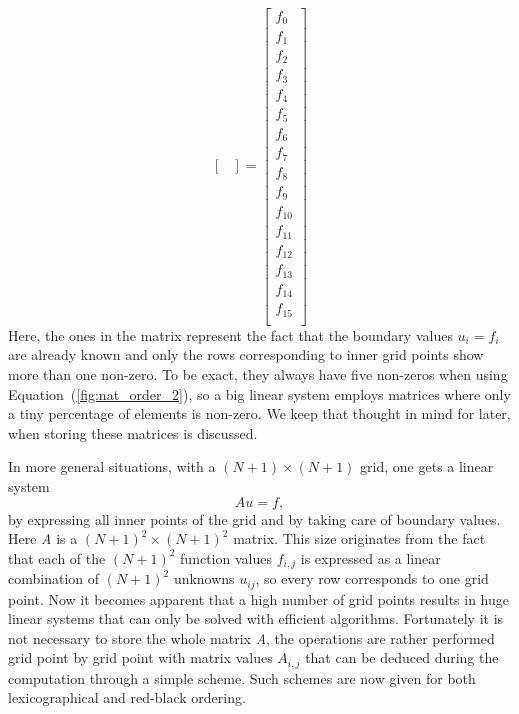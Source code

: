 \begin{equation}
\begin{bmatrix}
 \end{bmatrix} =
 \begin{bmatrix}
  f_{0}   \\
  f_{1}   \\
  f_{2}   \\
  f_{3}   \\
  f_{4}   \\
  f_{5}   \\
  f_{6}   \\
  f_{7}   \\
  f_{8}   \\
  f_{9}   \\
  f_{10}   \\
  f_{11}   \\
  f_{12}   \\
  f_{13}   \\
  f_{14}   \\
  f_{15}   \\
 \end{bmatrix}
 \label{equ:hugeA}
\end{equation}
Here, the ones in the matrix represent the fact that the boundary values $u_i = f_i$ are already known and only the rows corresponding to inner grid points show more than one non-zero. To be exact, they always have five non-zeros when using Equation~(\ref{fig:nat_order_2}), so a big linear system employs matrices where only a tiny percentage of elements is non-zero. We keep that thought in mind for later, when storing these matrices is discussed.


In more general situations, with a $(N+1) \times (N+1)$ grid, one gets a linear system
\begin{equation}
Au = f,
\end{equation}
by expressing all inner points of the grid and by taking care of boundary values. Here \textit{A} is a $(N+1) ^2 \times (N+1)^2$ matrix. This size originates from the fact that each of the $(N+1)^2$ function values $f_{i,j}$ is expressed as a linear combination of $(N+1)^2$ unknowns $u_{ij}$, so every row corresponds to one grid point. Now it becomes apparent that a high number of grid points results in huge linear systems that can only be solved with efficient algorithms. Fortunately it is not necessary to store the whole matrix \textit{A}, the operations are rather performed grid point by grid point with matrix values $A_{i,j}$ that can be deduced during the computation through a simple scheme. Such schemes are now given for both lexicographical and red-black ordering.

